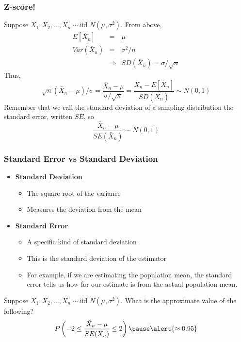 \documentclass{beamer}
\begin{document}
\begin{frame}
\frametitle{Z-score!}
Suppose $X_1, X_2, \hdots, X_n \sim \mbox{iid } N(\mu,\sigma^2)$. From above,
	\begin{eqnarray*}
			E[\bar{X}_n] &=& \mu\\
			Var(\bar{X}_n) &=&  \sigma^2/n\\ 
			&\Rightarrow& SD(\bar{X}_n) =\sigma/\sqrt{n}
	\end{eqnarray*} 
Thus,
	$$\sqrt{n}(\bar{X}_n - \mu)/\sigma =  \frac{\bar{X}_n - \mu}{\sigma/\sqrt{n}} =  \frac{\bar{X}_n - E[\bar{X}_n]}{SD(\bar{X}_n)}  \sim N(0,1)$$
Remember that we call the standard deviation of a sampling distribution the \alert{standard error}, written $SE$, so $$\frac{\bar{X}_n - \mu}{SE(\bar{X}_n)} \sim N(0,1)$$
\end{frame}

\begin{frame}
\frametitle{Standard Error vs Standard Deviation}
\begin{itemize}
	\item \textbf{Standard Deviation}
	\begin{itemize}
		\item The square root of the variance
		\item Measures the deviation from the mean
	\end{itemize}
	\item \textbf{Standard Error}
	\begin{itemize}
		\item A specific kind of standard deviation
		\item This is the standard deviation of the estimator
		\item For example, if we are estimating the population mean, the standard error tells us how far our estimate is from the actual population mean.
	\end{itemize}
\end{itemize}
\end{frame}

\begin{frame}
Suppose $X_1, X_2, \hdots, X_n \sim \mbox{iid } N(\mu,\sigma^2)$. What is the approximate value of the following?
$$P\left(-2 \leq \frac{\bar{X}_n - \mu}{SE(\bar{X}_n)} \leq 2 \right)\pause \alert{\approx 0.95}$$

\end{frame}
\end{document}
